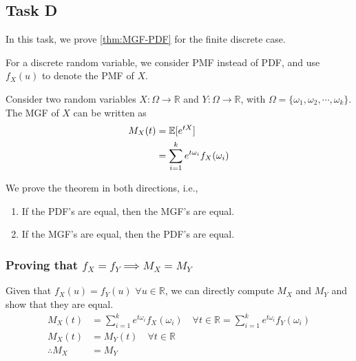 \subsection*{Task D}\label{taskD}
In this task, we prove \cref{thm:MGF-PDF} for the finite discrete case.
\begin{remark}
	For a discrete random variable, we consider PMF instead of PDF, and use $f_X(u)$ to denote the PMF of $X$.
\end{remark}
Consider two random variables $X:\Omega \to \mathbb{R}$ and $Y:\Omega\to\mathbb{R}$, with $\Omega = \{\omega_1, \omega_2,\cdots, \omega_k\}$.
The MGF of $X$ can be written as
\begin{align*}
	M_X(t) & = \operatorname{\mathbb{E}}[e^{tX}]                              \\
	       & = \sum_{i=1}^k e^{t\omega_i} f_X(\omega_i) \\
\end{align*}

We prove the theorem in both directions, i.e.,
\begin{enumerate}
	\item If the PDF's are equal, then the MGF's are equal.
	\item If the MGF's are equal, then the PDF's are equal.
\end{enumerate}

\subsubsection*{Proving that $f_X=f_Y \implies M_X = M_Y$}
Given that $f_X(u)=f_Y(u)$ $\forall u\in\mathbb{R}$, we can directly compute $M_X$ and $M_Y$ and show that they are equal.
\begin{align*}
	M_X(t)         & = \sum_{i=1}^k e^{t\omega_i} f_X\left(\omega_i\right) \hspace{1em}\forall t\in\mathbb{R}
	= \sum_{i=1}^k e^{t\omega_i} f_Y\left(\omega_i\right)                                                     \\
	M_X(t)         & = M_Y(t) \hspace{1em} \forall t\in\mathbb{R}                                             \\
	\therefore M_X & = M_Y
\end{align*}


